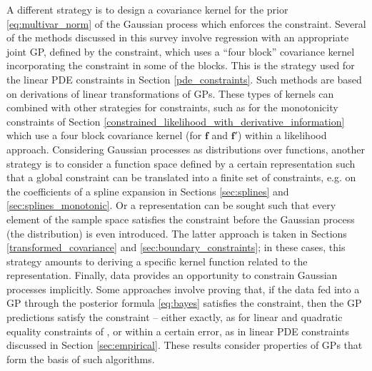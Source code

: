 A different strategy is to design a covariance kernel for the prior \eqref{eq:multivar_norm} of the Gaussian process which enforces the constraint.
Several of the methods discussed in this survey involve regression with an appropriate joint GP, defined by the constraint, which uses a ``four block'' covariance kernel incorporating the constraint in some of the blocks.
This is the strategy used for the linear PDE constraints in Section \ref{pde_constraints}.
Such methods are based on derivations of linear transformations of GPs. 
These types of kernels can combined with other strategies for constraints, such as for the monotonicity constraints of Section \ref{constrained_likelihood_with_derivative_information} which use a four block covariance kernel (for $\mathbf{f}$ and $\mathbf{f}'$) within a likelihood approach.
Considering Gaussian processes as distributions over functions, another strategy is to consider a function space defined by a certain representation such that a global constraint can be translated into a finite set of constraints, e.g. on the coefficients of a spline expansion in Sections \ref{sec:splines} and \ref{sec:splines_monotonic}. Or a representation can be sought such that every element of the sample space satisfies the constraint before the Gaussian process (the distribution) is even introduced. The latter approach is taken in Sections \ref{transformed_covariance} and \ref{sec:boundary_constraints}; in these cases, this strategy amounts to deriving a specific kernel function related to the representation. 
Finally, data provides an opportunity to constrain Gaussian processes implicitly. Some approaches involve proving that, if the data fed into a GP through the posterior formula \eqref{eq:bayes} satisfies the constraint, then the GP predictions satisfy the constraint -- either exactly, as for linear and quadratic equality constraints of , or within a certain error, as in linear PDE constraints discussed in Section \ref{sec:empirical}. These results consider properties of GPs that form the basis of such algorithms.

